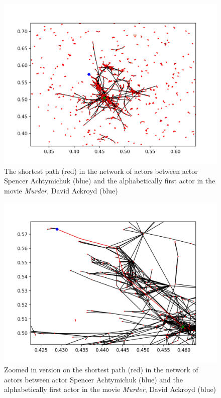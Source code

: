 \documentclass[12pt]{ieeeconf}      %
\begin{document}
\begin{figure}[H]
  \begin{center}
   \includegraphics[width=.75\textwidth]{figures/network-path}
    \caption{The shortest path (red) in the network of actors between actor Spencer Achtymichuk (blue) and the alphabetically first actor in the movie \textit{Murder}, David Ackroyd (blue)}
    \label{network:path}
  \end{center}
\end{figure}

\begin{figure}[H]
  \begin{center}
   \includegraphics[width=.75\textwidth]{figures/network-path-zoomed}
    \caption{Zoomed in version on the shortest path (red) in the network of actors between actor Spencer Achtymichuk (blue) and the alphabetically first actor in the movie \textit{Murder}, David Ackroyd (blue)}
    \label{network:path-zoomed}
  \end{center}
\end{figure}
\end{document}
